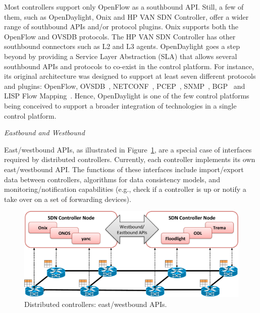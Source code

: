 Most controllers support only OpenFlow as a southbound API. Still, a few of them, such as OpenDaylight, 
Onix and HP VAN SDN Controller, offer a wider range of southbound APIs and/or protocol plugins. Onix 
supports both the OpenFlow and OVSDB protocols. The HP VAN SDN Controller has other southbound connectors 
such as L2 and L3 agents. OpenDaylight goes a step beyond by providing a Service Layer Abstraction (SLA) 
that allows several southbound APIs and protocols to co-exist in the control platform. For instance, its 
original architecture was designed to support at least seven different protocols and plugins: OpenFlow, OVSDB~\cite{pfaff2013-1}, NETCONF~\cite{enns2011-1}, PCEP~\cite{vasseur2009}, SNMP~\cite{harrington2002}, BGP~\cite{rekhter2006} and LISP Flow Mapping~\cite{opendaylight2013}. Hence, OpenDaylight is one of 
the few control platforms being conceived to support a broader integration of technologies in a single 
control platform.


\vspace{2mm}
\noindent \textit{Eastbound and Westbound}

East/westbound APIs, as illustrated in Figure~\ref{fig:eastwestbounds}, are a special case of interfaces 
required by distributed controllers.
Currently, each controller implements its own east/westbound API. The functions of these interfaces include
import/export data between controllers, algorithms for data consistency models, and monitoring/notification 
capabilities (e.g., check if a controller is up or notify a take over on a set of forwarding devices).

\begin{figure}[ht]
\centering
\includegraphics[width=0.99\columnwidth]{figures/fig7_sdn_eastwestbound.pdf}
\caption{Distributed controllers: east/westbound APIs.}
\label{fig:eastwestbounds}
\end{figure}


